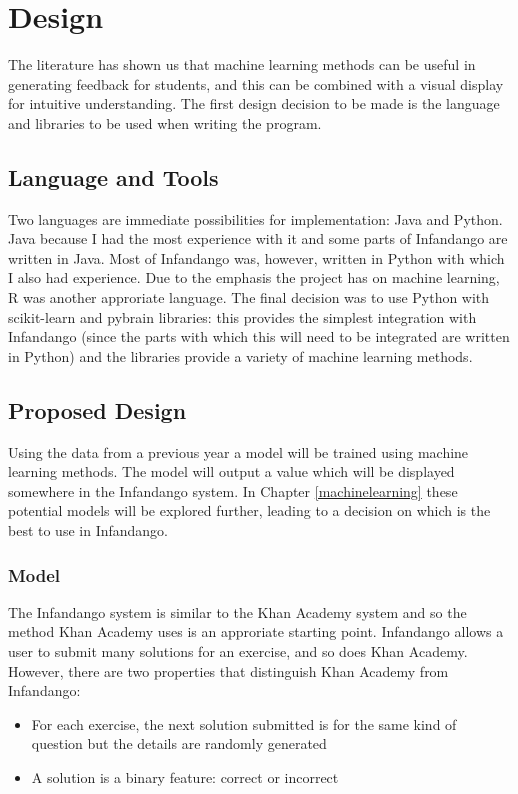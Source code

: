 \chapter{Design}
\label{design}
The literature has shown us that machine learning methods can be useful in generating feedback for students, and this can be combined with a visual display for intuitive understanding. The first design decision to be made is the language and libraries to be used when writing the program.
\section{Language and Tools}
Two languages are immediate possibilities for implementation: Java\cite{java_site} and Python\cite{python_site}. Java because I had the most experience with it and some parts of Infandango are written in Java. Most of Infandango was, however, written in Python with which I also had experience. Due to the emphasis the project has on machine learning, R\cite{r_site} was another approriate language. 
The final decision was to use Python with scikit-learn\cite{scikit_site} and pybrain\cite{pybrain_site} libraries: this provides the simplest integration with Infandango (since the parts with which this will need to be integrated are written in Python) and the libraries provide a variety of machine learning methods.

\section{Proposed Design}
Using the data from a previous year a model will be trained using machine learning methods. The model will output a value which will be displayed somewhere in the Infandango system. In Chapter \ref{machinelearning} these potential models will be explored further, leading to a decision on which is the best to use in Infandango.
\subsection{Model}
The Infandango system is similar to the Khan Academy system and so the method Khan Academy uses is an approriate starting point. Infandango allows a user to submit many solutions for an exercise, and so does Khan Academy. However, there are two properties that distinguish Khan Academy from Infandango:

\begin{itemize}
\item For each exercise, the next solution submitted is for the same kind of question but the details are randomly generated %
\item A solution is a binary feature: correct or incorrect
\end{itemize}

